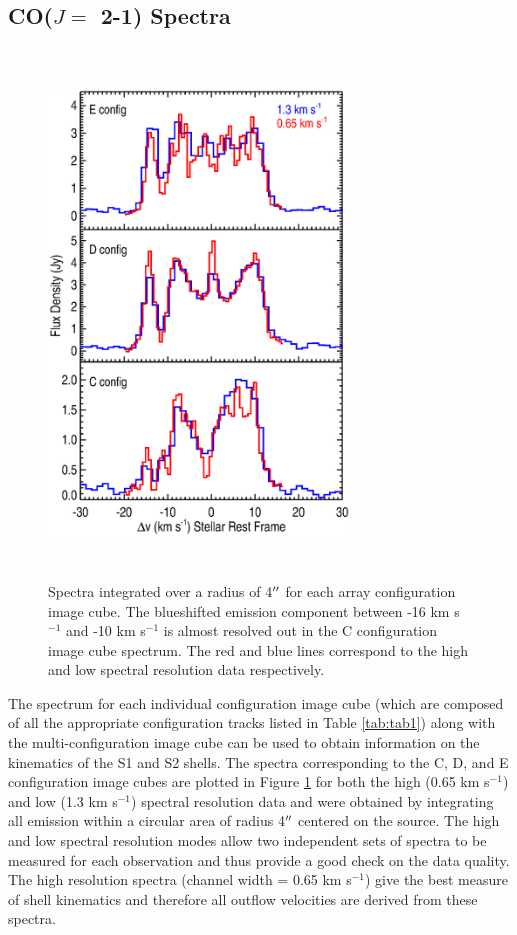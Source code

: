 \documentclass[iop]{emulateapj}
\begin{document}
\subsection{CO($J=$ 2-1) Spectra} \label{results1} %

\begin{figure}
\includegraphics[trim=90pt 60pt 45pt 50pt, clip, width=8.0cm, height=14.0cm]{f1.eps}
\caption{Spectra integrated over a radius of 4$\mbox{$^{\prime\prime}$}$ for each array configuration image cube. The blueshifted emission component between -16 km s${}^{-1}$ and -10 km s${}^{-1}$ is almost resolved out in the C configuration image cube spectrum. The red and blue lines correspond to the high and low spectral resolution data respectively.\label{fig1}}
\label{fig:fig1}
\end{figure}

The spectrum for each individual configuration image cube (which are composed of all the appropriate configuration tracks listed in Table \ref{tab:tab1}) along with the multi-configuration image cube can be used to obtain information on the kinematics of the S1 and S2 shells. The spectra corresponding  to the C, D, and E configuration image cubes are plotted in Figure \ref{fig:fig1} for both the high (0.65 km s${}^{-1}$) and low (1.3 km s${}^{-1}$) spectral resolution data and were obtained by integrating all emission within a circular area of radius 4$\mbox{$^{\prime\prime}$}$ centered on the source. The high and low spectral resolution modes allow two independent sets of spectra to be measured for each observation and thus provide a good check on the data quality. The high resolution  spectra (channel width = 0.65 km s${}^{-1}$)  give the best measure of shell kinematics and therefore all outflow velocities are derived from these spectra.
\end{document}
